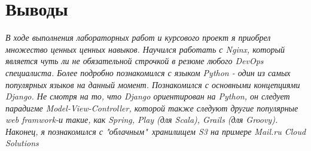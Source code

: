 \section{Выводы}
{\itshape В ходе выполнения лабораторных работ и курсового проект я приобрел множество ценных ценных навыков. Научился работать с Nginx, который является чуть ли не обязательной строчкой в резюме любого DevOps специалиста. Более подробно познакомился с языком Python - один из самых популярных языков на данный момент. Познакомился с основными концепциями Django. Не смотря на то, что Django ориентирован на Python, он следует парадигме Model-View-Controller, которой также следуют другие популярные web framwork-и такие, как Spring, Play (для Scala), Grails (для Groovy). Наконец, я познакомился с "облачным"\ хранилищем S3 на примере Mail.ru Cloud Solutions}
\pagebreak
